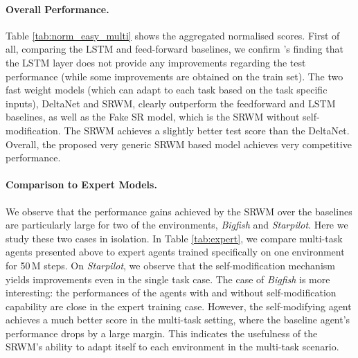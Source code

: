 \documentclass[nohyperref]{article}
\theoremstyle{plain}
\theoremstyle{definition}
\theoremstyle{remark}
\begin{document}
\paragraph{Overall Performance.}
Table \ref{tab:norm_easy_multi} shows the aggregated normalised scores.
First of all, comparing the LSTM and feed-forward baselines,
we confirm \citet{CobbeHHS20}'s finding that the LSTM layer does not provide
any improvements regarding the test performance (while some improvements
are obtained on the train set).
The two fast weight models (which can adapt to each task based on the task specific inputs), DeltaNet and SRWM,
clearly outperform the feedforward and LSTM baselines, as well as the Fake SR model, which is the SRWM without self-modification.
The SRWM achieves a slightly better test score
than the DeltaNet.
Overall, the proposed very generic SRWM based model achieves very competitive performance.


\paragraph{Comparison to Expert Models.}
We observe that the performance gains achieved by the SRWM
over the baselines are particularly large for two of the environments,
\textit{Bigfish} and \textit{Starpilot}.
Here we study these two cases in isolation.
In Table \ref{tab:expert}, we compare  multi-task agents presented above to expert agents trained specifically on one environment for 50\,M steps.
On \textit{Starpilot}, we observe that the self-modification mechanism yields improvements even in the single task case.
The case of \textit{Bigfish} is more interesting:
the performances of the agents with and without self-modification capability are close in the expert training case.
However, the self-modifying agent achieves a much better score in the multi-task setting, where the baseline agent's performance drops by a large margin.
This indicates the usefulness of the SRWM's ability to adapt itself to each environment in the multi-task scenario.
\end{document}
